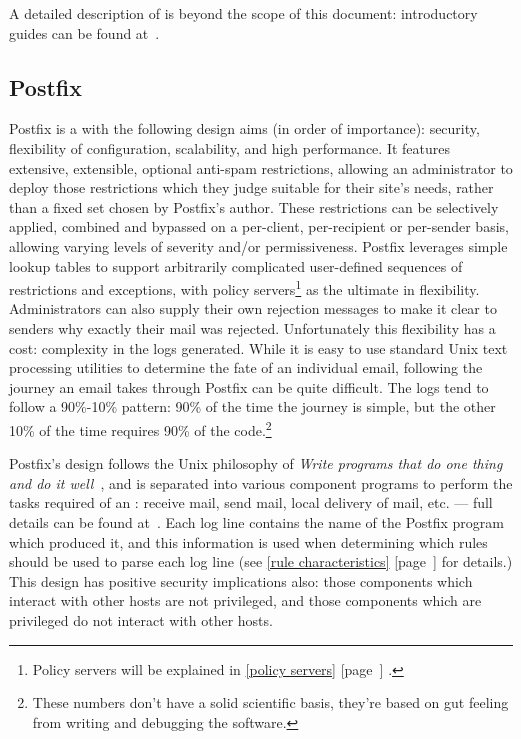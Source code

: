 \documentclass[a4paper,12pt,draft]{article}
\newcommand{\refwithpage}[1]{%
    \empty{}\ref{#1} [page~\pageref{#1}]%
}
\newcommand{\sectionref}[1]{%
    \textsection{}\refwithpage{#1}%
}
\begin{document}
A detailed description of \SMTP{} is beyond the scope of this document:
introductory guides can be found at~\cite{smtp-intro-01, smtp-intro-02}.

\subsection{Postfix}

\label{postfix background}

Postfix is a \MTA{} with the following design aims (in order of
importance): security, flexibility of configuration, scalability, and high
performance.  It features extensive, extensible, optional anti-spam
restrictions, allowing an administrator to deploy those restrictions which
they judge suitable for their site's needs, rather than a fixed set chosen
by Postfix's author.  These restrictions can be selectively applied,
combined and bypassed on a per-client, per-recipient or per-sender basis,
allowing varying levels of severity and/or permissiveness.  Postfix
leverages simple lookup tables to support arbitrarily complicated
user-defined sequences of restrictions and exceptions, with policy
servers\footnote{Policy servers will be explained in \sectionref{policy
servers}.} as the ultimate in flexibility.  Administrators can also supply
their own rejection messages to make it clear to senders why exactly their
mail was rejected.  Unfortunately this flexibility has a cost: complexity
in the logs generated.  While it is easy to use standard Unix text
processing utilities to determine the fate of an individual email,
following the journey an email takes through Postfix can be quite
difficult.  The logs tend to follow a 90\%-10\% pattern: 90\% of the time
the journey is simple, but the other 10\% of the time requires 90\% of the
code.\footnote{These numbers don't have a solid scientific basis, they're
based on gut feeling from writing and debugging the software.}

Postfix's design follows the Unix philosophy of \textit{Write programs that
do one thing and do it well\/}~\cite{unix-philosophy}, and is separated
into various component programs to perform the tasks required of an
\MTA{}\@: receive mail, send mail, local delivery of mail, etc. --- full
details can be found at~\cite{postfix-overview}.  Each log line contains
the name of the Postfix program which produced it, and this information is
used when determining which rules should be used to parse each log line
(see \sectionref{rule characteristics} for details.)  This design has
positive security implications also: those components which interact with
other hosts are not privileged, and those components which are privileged
do not interact with other hosts.
\end{document}
